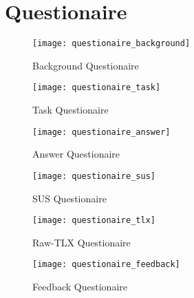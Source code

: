 \chapter{Questionaire}\label{sec:appendix}

\begin{figure*}[!htb]
  \caption{Background Questionaire}
  \label{fig:questionaire_background}
  \centering
  \texttt{[image: questionaire\_background]}
\end{figure*}

\begin{figure*}[!htb]
  \caption{Task Questionaire}
  \label{fig:questionaire_task}
  \centering
  \texttt{[image: questionaire\_task]}
\end{figure*}

\begin{figure*}[!htb]
  \caption{Answer Questionaire}
  \label{fig:questionaire_answer}
  \centering
  \texttt{[image: questionaire\_answer]}
\end{figure*}

\begin{figure*}[!htb]
  \caption{SUS Questionaire}
  \label{fig:questionaire_sus}
  \centering
  \texttt{[image: questionaire\_sus]}
\end{figure*}

\begin{figure*}[!htb]
  \caption{Raw-TLX Questionaire}
  \label{fig:questionaire_tlx}
  \centering
  \texttt{[image: questionaire\_tlx]}
\end{figure*}

\begin{figure*}[!htb]
  \caption{Feedback Questionaire}
  \label{fig:questionaire_feedback}
  \centering
  \texttt{[image: questionaire\_feedback]}
\end{figure*}
